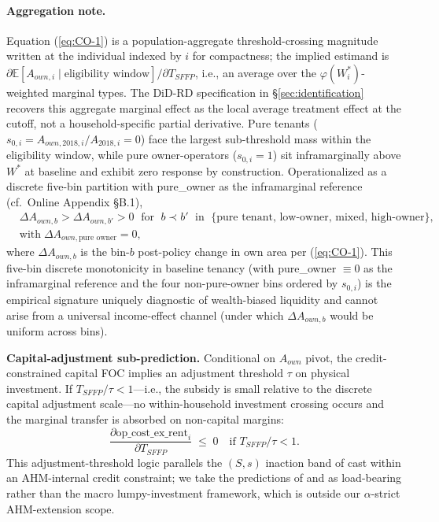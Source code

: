 \documentclass[12pt, a4paper]{article}
\begin{document}
\paragraph{Aggregation note.} Equation (\ref{eq:CO-1}) is a population-aggregate threshold-crossing magnitude written at the individual indexed by $i$ for compactness; the implied estimand is $\partial \mathbb{E}[A_{own,i} \mid \text{eligibility window}]/\partial T_{SFFP}$, i.e., an average over the $\varphi(W_i^*)$-weighted marginal types. The DiD-RD specification in \S\ref{sec:identification} recovers this aggregate marginal effect as the local average treatment effect at the cutoff, not a household-specific partial derivative. Pure tenants ($s_{0,i} = A_{own,2018,i}/A_{2018,i} = 0$) face the largest sub-threshold mass within the eligibility window, while pure owner-operators ($s_{0,i} = 1$) sit inframarginally above $W^*$ at baseline and exhibit zero response by construction. Operationalized as a discrete five-bin partition with pure\_owner as the inframarginal reference (cf.\ Online Appendix \S B.1),
\begin{equation}
\boxed{\begin{aligned}
&\Delta A_{own,b} > \Delta A_{own,b'} > 0
   \;\text{ for }\; b \prec b' \;\text{ in }\; \{\text{pure tenant},\, \text{low-owner},\, \text{mixed},\, \text{high-owner}\}, \\
&\text{with}\; \Delta A_{own,\text{pure owner}} = 0,
\end{aligned}}
\label{eq:CO-2}
\end{equation}
where $\Delta A_{own,b}$ is the bin-$b$ post-policy change in own area per (\ref{eq:CO-1}). This five-bin discrete monotonicity in baseline tenancy (with pure\_owner $\equiv 0$ as the inframarginal reference and the four non-pure-owner bins ordered by $s_{0,i}$) is the empirical signature uniquely diagnostic of wealth-biased liquidity and cannot arise from a universal income-effect channel (under which $\Delta A_{own,b}$ would be uniform across bins).

\textbf{Capital-adjustment sub-prediction.} Conditional on $A_{own}$ pivot, the credit-constrained capital FOC implies an adjustment threshold $\tau$ on physical investment. If $T_{SFFP}/\tau < 1$---i.e., the subsidy is small relative to the discrete capital adjustment scale---no within-household investment crossing occurs and the marginal transfer is absorbed on non-capital margins:
\begin{equation}
\boxed{\frac{\partial \text{op\_cost\_ex\_rent}_i}{\partial T_{SFFP}} \;\le\; 0 \quad \text{if } T_{SFFP}/\tau < 1.}
\label{eq:CO-3}
\end{equation}
This adjustment-threshold logic parallels the $(S,s)$ inaction band of \citet{CaballeroEngel1999_lumpy} cast within an AHM-internal credit constraint; we take the predictions of \citet{CarterOlinto2003_liquidity} and \citet{Kazukauskas2013_disinvestment} as load-bearing rather than the macro lumpy-investment framework, which is outside our $\alpha$-strict AHM-extension scope.
\end{document}
